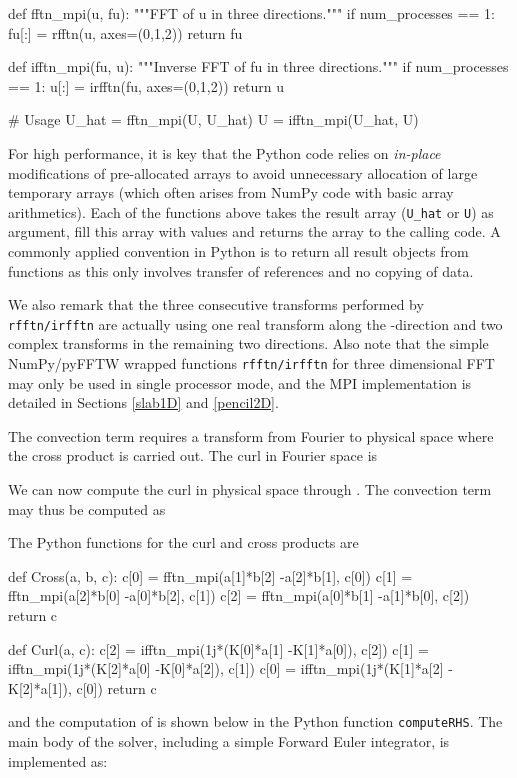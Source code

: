 \documentclass[final,3p,times,twocolumn]{elsarticle}
\newcommand{\inpyth}{\lstinline[style=inlinestyle]}
\begin{document}
\begin{python}
def fftn_mpi(u, fu):
    """FFT of u in three directions."""
    if num_processes == 1:   
        fu[:] = rfftn(u, axes=(0,1,2))
    return fu

def ifftn_mpi(fu, u):
    """Inverse FFT of fu in three directions."""
    if num_processes == 1:
        u[:] = irfftn(fu, axes=(0,1,2))
    return u

# Usage
U_hat = fftn_mpi(U, U_hat)
U = ifftn_mpi(U_hat, U)
\end{python}
For high performance, it is key that the Python code relies on \emph{in-place}
modifications of pre-allocated arrays to avoid unnecessary allocation of
large temporary arrays (which often arises from NumPy code with basic array 
arithmetics). 
Each of the functions above takes the result array (\texttt{U\_hat} or
\texttt{U}) as argument, fill this array with values and returns the
array to the calling code. A commonly applied convention in
Python is to return all result objects from functions as this only involves
transfer of references and no copying of data.

We also remark that the three consecutive transforms performed by 
\inpyth{rfftn/irfftn} are actually using one real transform along the 
-direction and two complex transforms in the remaining two directions. Also 
note that the simple NumPy/pyFFTW wrapped functions \inpyth{rfftn/irfftn} for 
three dimensional FFT may only be used in single processor mode, and the MPI 
implementation is detailed in Sections
\ref{slab1D} and \ref{pencil2D}.

The convection term requires a transform from Fourier to physical space where the cross product  is carried out. The curl in Fourier space is

We can now compute the curl in physical space through . The convection term may thus be computed as

The Python functions for the curl and cross products are

\begin{python}
def Cross(a, b, c):
    c[0] = fftn_mpi(a[1]*b[2]
                   -a[2]*b[1], c[0])
    c[1] = fftn_mpi(a[2]*b[0]
                   -a[0]*b[2], c[1])
    c[2] = fftn_mpi(a[0]*b[1]
                   -a[1]*b[0], c[2])
    return c

def Curl(a, c):
    c[2] = ifftn_mpi(1j*(K[0]*a[1]
                        -K[1]*a[0]), c[2])
    c[1] = ifftn_mpi(1j*(K[2]*a[0]
                        -K[0]*a[2]), c[1])
    c[0] = ifftn_mpi(1j*(K[1]*a[2]
                        -K[2]*a[1]), c[0])
    return c

\end{python}
and the computation of  is 
shown below in the Python function \inpyth{computeRHS}. The main body of the 
solver, including a simple Forward Euler integrator, is implemented as:
\end{document}
